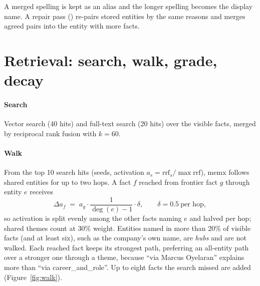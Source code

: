 A merged spelling is kept as an alias and the longer spelling becomes the display name. A repair pass
() re-pairs stored entities by the same reasons and merges agreed pairs into the entity with
more facts.

\section{Retrieval: search, walk, grade, decay}\label{sec:recall}

\paragraph{Search} Vector search (40 hits) and full-text search (20 hits) over the visible facts, merged by reciprocal
rank fusion with $k=60$.

\paragraph{Walk} From the top 10 search hits (seeds, activation $a_s=\text{rrf}_s/\max\text{rrf}$), memx follows shared
entities for up to two hops. A fact $f$ reached from frontier fact $g$ through entity $e$ receives
\begin{equation}
\Delta a_f \;=\; a_g \cdot \frac{1}{\deg(e)-1}\cdot \delta,\qquad \delta=0.5\ \text{per hop},
\end{equation}
so activation is split evenly among the other facts naming $e$ and halved per hop; shared themes count at 30\% weight.
Entities named in more than 20\% of visible facts (and at least six), such as the company's own name, are \emph{hubs}
and are not walked. Each reached fact keeps its strongest path, preferring an all-entity path over a stronger one
through a theme, because ``via Marcus Oyelaran'' explains more than ``via career\_and\_role''. Up to eight facts the
search missed are added (Figure~\ref{fig:walk}).

